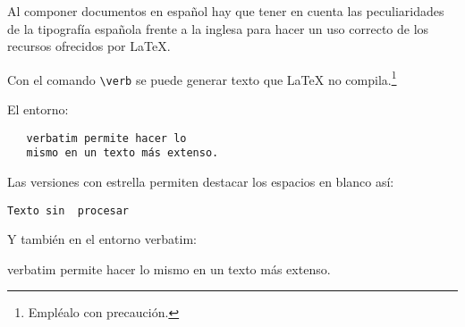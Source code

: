 \documentclass[11pt,a4paper]{article}
\begin{document}
Al componer documentos en español hay que tener en cuenta las peculiaridades de la tipografía española frente a la inglesa para hacer un uso correcto de los recursos ofrecidos por \LaTeX.

\noindent Con el comando \verb+\verb+ se puede generar texto que \LaTeX{} no compila.\footnote{Empléalo con precaución.}



El entorno:
\begin{verbatim}
   verbatim permite hacer lo 
   mismo en un texto más extenso.
\end{verbatim} 

\noindent Las versiones con estrella permiten destacar los espacios en blanco así:

\verb*|Texto sin  procesar|

\noindent Y también en el entorno verbatim:

\begin{verbatim*}
   verbatim permite hacer lo 
   mismo en un texto más extenso.
\end{verbatim*} 
\end{document}
